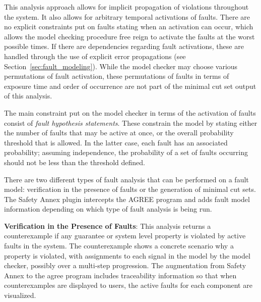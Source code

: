 This analysis approach allows for implicit propagation of violations throughout the system. It also allows for arbitrary temporal activations of faults. There are no explicit constraints put on faults stating when an activation can occur, which allows the model checking procedure free reign to activate the faults at the worst possible times. If there are dependencies regarding fault activations, these are handled through the use of explicit error propagations (see Section~\ref{sec:fault_modeling}). While the model checker may choose various permutations of fault activation, these permutations of faults in terms of exposure time and order of occurrence are not part of the minimal cut set output of this analysis. 

The main constraint put on the model checker in terms of the activation of faults consist of {\em fault hypothesis statements}. These constrain the model by stating either the number of faults that may be active at once, or the overall probability threshold that is allowed. In the latter case, each fault has an associated probability; assuming independence, the probability of a set of faults occurring should not be less than the threshold defined. 

There are two different types of fault analysis that can be performed on a fault model: verification in the presence of faults or the generation of minimal cut sets. The Safety Annex plugin intercepts the AGREE program and adds fault model information depending on which type of fault analysis is being run.

\textbf{Verification in the Presence of Faults}: This analysis returns a counterexample if any guarantee or system level property is violated by active faults in the system. The counterexample shows a concrete scenario why a property is violated, with assignments to each signal in the model by the model checker, possibly over a multi-step progression. The augmentation from Safety Annex to the \gls{agree} program includes traceability information so that when counterexamples are displayed to users, the active faults for each component are visualized.

